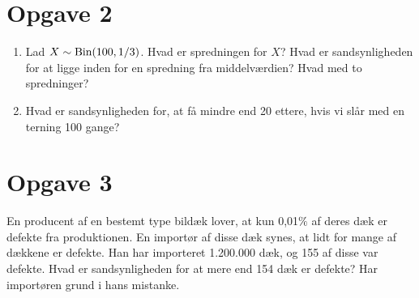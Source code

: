 \section*{Opgave 2}
\begin{enumerate}[label=\roman*)]
\item Lad $X\sim \textnormal{Bin}(100,1/3)$. Hvad er spredningen for $X$? Hvad er sandsynligheden for at ligge inden for en spredning fra middelværdien? Hvad med to spredninger? 
\item Hvad er sandsynligheden for, at få mindre end 20 ettere, hvis vi slår med en terning 100 gange?
\end{enumerate}
\section*{Opgave 3}
En producent af en bestemt type bildæk lover, at kun 0,01$\%$ af deres dæk er defekte fra produktionen. En importør af disse dæk synes, at lidt for mange af dækkene er defekte. Han har importeret 1.200.000 dæk, og 155 af disse var defekte. Hvad er sandsynligheden for at mere end 154 dæk er defekte? Har importøren grund i hans mistanke.
